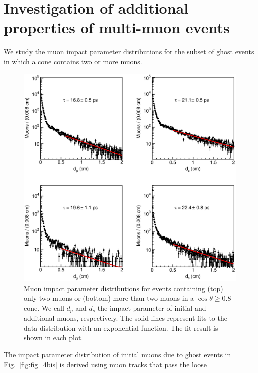 \documentclass[aps,prd,preprint,floatfix,nofootinbib,superscriptaddress,showpacs,amssymb]{revtex4}
\begin{document}
\section{Investigation of additional properties of multi-muon events}
\label{sec:ss-inter}
 We study the muon impact parameter distributions for the subset
 of ghost events in which a cone contains two or more muons.
 \begin{figure}
 \begin{center}
 \vspace{-0.3in}
 \leavevmode
 \includegraphics*[width=\textwidth]{fa0_15.eps}
 \caption[]{Muon impact parameter distributions for events containing (top) 
            only two muons or (bottom) more than two muons in a 
            $\cos \theta  \geq 0.8$ cone. We call $d_p$ and $d_s$ the
            impact parameter of  initial and additional muons, respectively.
            The solid lines represent fits to the data distribution with 
            an exponential function. The fit result is shown in each plot.}
 \label{fig:fig_15}
 \end{center}
 \end{figure}
 The impact parameter distribution of initial muons due to ghost events in
 Fig.~\ref{fig:fig_4bis} is derived using muon tracks that pass the loose
\end{document}
